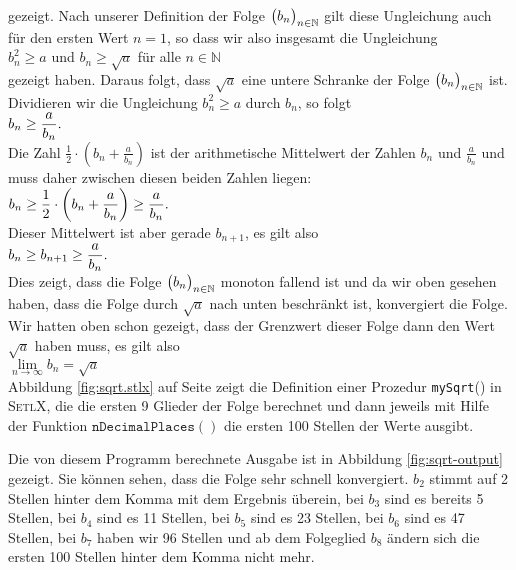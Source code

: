 \\[0.2cm]
gezeigt.  Nach unserer Definition der Folge $\bigl(b_n\bigr)_{n\in\mathbb{N}}$ gilt diese Ungleichung auch f\"ur
den ersten Wert $n=1$, so dass wir also insgesamt die Ungleichung
\\[0.2cm]
\hspace*{1.3cm}
$b_n^2 \geq a$ \quad und \quad $b_n \geq \sqrt{a}$ \quad f\"ur alle $n \in \mathbb{N}$
\\[0.2cm]
gezeigt haben.   Daraus folgt, dass $\sqrt{a}$ eine untere Schranke der Folge $\bigl(b_n\bigr)_{n\in\mathbb{N}}$
ist.  Dividieren wir die Ungleichung $b_n^2 \geq a$ durch $b_{n}$, so folgt
\\[0.2cm]
\hspace*{1.3cm}
$\displaystyle b_{n} \geq \frac{a}{b_{n}}.  $
\\[0.2cm]
Die Zahl $\frac{1}{2}\cdot \left(b_n + \frac{a}{b_n}\right)$ ist der arithmetische
Mittelwert der Zahlen $b_n$ und $\frac{a}{b_n}$ und muss daher zwischen diesen beiden
Zahlen liegen:
\\[0.2cm]
\hspace*{1.3cm}
$\displaystyle b_{n} \geq \frac{1}{2}\cdot \left(b_n + \frac{a}{b_n}\right) \geq \frac{a}{b_n}. $
\\[0.2cm]
Dieser Mittelwert ist aber gerade $b_{n+1}$, es gilt also
\\[0.2cm]
\hspace*{1.3cm}
$\displaystyle b_{n} \geq b_{n+1} \geq \frac{a}{b_n}. $
\\[0.2cm]
Dies zeigt, dass die Folge $\bigl(b_n\bigr)_{n\in\mathbb{N}}$ monoton fallend ist und da wir oben gesehen haben, dass die
Folge durch $\sqrt{a}$ nach unten beschr\"ankt ist, konvergiert die Folge.
Wir hatten oben schon gezeigt, dass der Grenzwert dieser Folge dann den Wert $\sqrt{a}$ haben muss, es
gilt also
\\[0.2cm]
\hspace*{1.3cm}
$ \lim\limits_{n\rightarrow\infty} b_n = \sqrt{a} $
\\[0.2cm]
Abbildung \ref{fig:sqrt.stlx} auf Seite \pageref{fig:sqrt.stlx}
zeigt die Definition einer Prozedur \texttt{mySqrt}()
in \textsc{SetlX}, die die ersten 9 Glieder der Folge  
berechnet und dann jeweils mit Hilfe der Funktion $\texttt{nDecimalPlaces}()$ die ersten
100 Stellen der Werte ausgibt.  

Die von diesem Programm berechnete Ausgabe ist in
Abbildung \ref{fig:sqrt-output} gezeigt.  Sie k\"onnen sehen, dass die Folge sehr schnell
konvergiert.   $b_2$ stimmt auf 2 Stellen hinter dem Komma mit dem Ergebnis \"uberein,
bei $b_3$ sind es bereits 5 Stellen, bei $b_4$ sind es 11 Stellen, bei $b_5$ sind es 23
Stellen, bei $b_6$ sind es 47 Stellen, bei $b_7$ haben wir 96 Stellen und ab dem Folgeglied $b_8$ 
\"andern sich die ersten 100 Stellen hinter dem Komma nicht mehr.  

